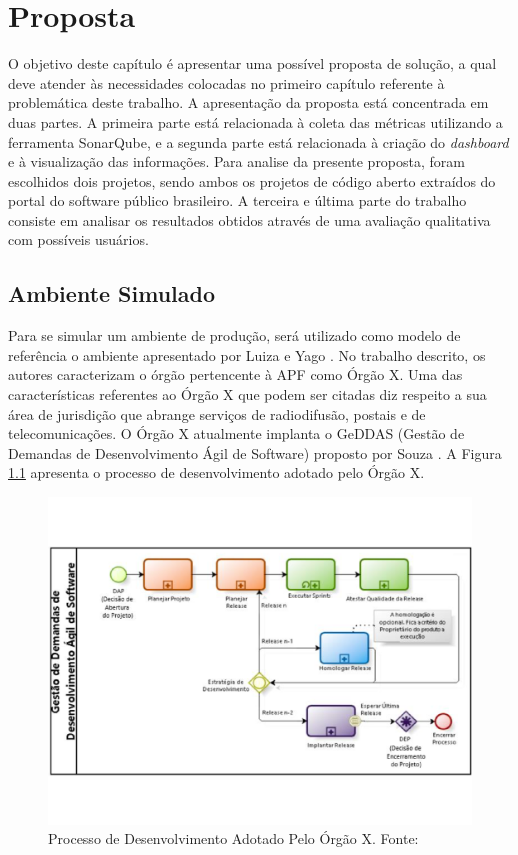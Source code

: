 \chapter[Proposta]{Proposta}
O objetivo deste capítulo é apresentar uma possível proposta de solução, a qual deve atender às necessidades colocadas no primeiro capítulo referente à problemática deste trabalho. A apresentação da proposta está concentrada em duas partes. A primeira parte está relacionada à coleta das métricas utilizando a ferramenta SonarQube, e a segunda parte está relacionada à criação do \textit{dashboard} e à visualização das informações. Para analise da presente proposta, foram escolhidos dois projetos, sendo ambos os projetos de código aberto extraídos do portal do software público brasileiro. A terceira e última parte do trabalho consiste em analisar os resultados obtidos através de uma avaliação qualitativa com possíveis usuários.

\section{Ambiente Simulado}
Para se simular um ambiente de produção, será utilizado como modelo de referência o ambiente apresentado por Luiza e Yago \cite{luiza_yago}. No trabalho descrito, os autores caracterizam o órgão pertencente à APF como Órgão X. Uma das características referentes ao Órgão X que podem ser citadas diz respeito a sua área de jurisdição que abrange serviços de radiodifusão, postais e de telecomunicações. O Órgão X atualmente implanta o GeDDAS (Gestão de Demandas de Desenvolvimento Ágil de Software) proposto por Souza \cite{souza_sobrinho_uso_2014}. A Figura \ref{img:proc_des} apresenta o processo de desenvolvimento adotado pelo Órgão X.

\graphicspath{{figuras/}}
\begin{figure}[H]
\centering
\includegraphics[scale=0.60]{Proc_des.pdf}
\caption{Processo de Desenvolvimento Adotado Pelo Órgão X. Fonte: \cite{luiza_yago}}
\label{img:proc_des}
\end{figure}

